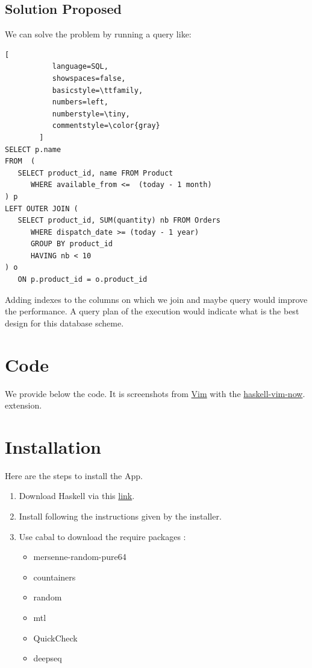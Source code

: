 \documentclass[12pt,a4paper,article]{memoir} %
\begin{document}
\section{Solution Proposed}
We can solve the problem by running a query like:
\begin{lstlisting}[
           language=SQL,
           showspaces=false,
           basicstyle=\ttfamily,
           numbers=left,
           numberstyle=\tiny,
           commentstyle=\color{gray}
        ]
SELECT p.name
FROM  (
   SELECT product_id, name FROM Product 
      WHERE available_from <=  (today - 1 month)
) p
LEFT OUTER JOIN (
   SELECT product_id, SUM(quantity) nb FROM Orders
      WHERE dispatch_date >= (today - 1 year)
      GROUP BY product_id
      HAVING nb < 10
) o
   ON p.product_id = o.product_id
\end{lstlisting}

Adding indexes to the columns on which we join and maybe query would improve 
the performance. 
A query plan of the execution would indicate what is the best design for this 
database scheme.



\newpage
\appendix
{}

\chapter{Code} \label{apx:code}
We provide below the code. It is screenshots from 
\href{https://vim.sourceforge.io/}{Vim} with the 
\href{https://github.com/begriffs/haskell-vim-now}{haskell-vim-now}.
extension.


\newpage
\chapter{Installation} \label{apx:installation}

Here are the steps to install the App.
\begin{enumerate}
	\item Download Haskell via this \href{https://www.haskell.org/platform/}{link}.
	\item Install following the instructions given by the installer.
	\item Use cabal to download the require packages :
\begin{itemize}
	\item mersenne-random-pure64
	\item countainers
	\item random
	\item mtl
	\item QuickCheck
	\item deepseq
\end{itemize}
\end{enumerate}
\end{document}

